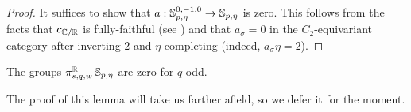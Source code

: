 \begin{proof}
  It suffices to show that $a : \operatorname{\mathbb{S}}_{p,\eta}^{0,-1,0} \to \operatorname{\mathbb{S}}_{p,\eta}$ is zero.
  This follows from the facts that $c_{\mathbb{C}/\mathbb{R}}$ is fully-faithful (see \cite{HellerOrmsbyII}) and that $a_{\sigma}=0$ in the $C_2$-equivariant category after inverting $2$ and $\eta$-completing (indeed, $a_{\sigma} \eta = 2$).
\end{proof}

\begin{lem} \label{lem:odd-vanishing}
  The groups $\pi_{s,q,w}^{\mathbb{R}} \operatorname{\mathbb{S}}_{p,\eta}$ are zero for $q$ odd.
\end{lem}

The proof of this lemma will take us farther afield, so we defer it for the moment.

